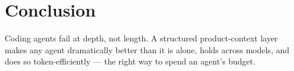 \documentclass[11pt]{article}
\begin{document}
\section{Conclusion}
Coding agents fail at depth, not length. A structured product-context layer makes any
agent dramatically better than it is alone, holds across models, and does so
token-efficiently --- the right way to spend an agent's budget.



\end{document}
